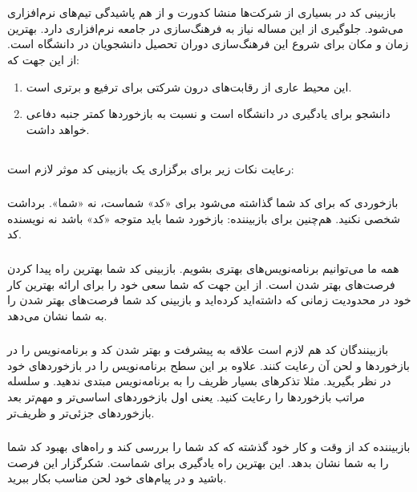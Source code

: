 \section{}
بازبینی کد در بسیاری از شرکت‌ها منشا کدورت و از هم پاشیدگی تیم‌های نرم‌افزاری می‌شود. جلوگیری از این مساله نیاز به فرهنگ‌سازی در جامعه نرم‌افزاری دارد. بهترین زمان و مکان برای شروع این فرهنگ‌سازی دوران تحصیل دانشجویان در دانشگاه است. از این جهت که:
\indent
\begin{enumerate}
	\item
	      این محیط عاری از رقابت‌های درون شرکتی برای ترفیع و برتری است.
	\item
	      دانشجو برای یادگیری در دانشگاه است و نسبت به بازخوردها کمتر جنبه دفاعی خواهد داشت.
\end{enumerate}
\noindent

\subsection{}
رعایت نکات زیر برای برگزاری یک بازبینی کد موثر لازم است:
\subsubsection{}
بازخوردی که برای کد شما گذاشته می‌شود برای «کد» شماست، نه «شما». برداشت شخصی نکنید. هم‌چنین برای بازبیننده:‌ بازخورد شما باید متوجه «کد» باشد نه نویسنده کد.
\subsubsection{}
همه ما می‌توانیم برنامه‌نویس‌های بهتری بشویم. بازبینی کد شما بهترین راه پیدا کردن فرصت‌های بهتر شدن است. از این جهت که شما سعی خود را برای ارائه بهترین کار خود در محدودیت زمانی که داشته‌اید کرده‌اید و بازبینی کد شما فرصت‌های بهتر شدن را به شما نشان می‌دهد.
\subsubsection{}
بازبینندگان کد هم لازم است علاقه به پیشرفت و بهتر شدن کد و برنامه‌نویس را در بازخوردها و لحن آن رعایت کنند. علاوه بر این سطح برنامه‌نویس را در بازخوردهای خود در نظر بگیرید. مثلا تذکرهای بسیار ظریف را به برنامه‌نویس مبتدی ندهید. و سلسله مراتب بازخوردها را رعایت کنید. یعنی اول بازخوردهای اساسی‌تر و مهم‌تر بعد بازخورد‌های جزئی‌تر و ظریف‌تر.
\subsubsection{}
بازبیننده کد از وقت و کار خود گذشته که کد شما را بررسی کند و راه‌های بهبود کد شما را به شما نشان بدهد. این بهترین راه یادگیری برای شماست. شکرگزار این فرصت باشید و در پیام‌های خود لحن مناسب بکار ببرید.
